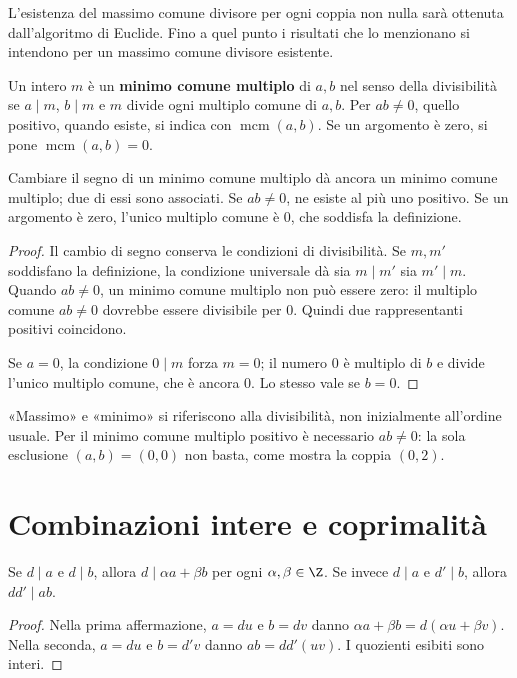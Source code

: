 L'esistenza del massimo comune divisore per ogni coppia non nulla sarà ottenuta dall'algoritmo di Euclide. Fino a quel punto i risultati che lo menzionano si intendono per un massimo comune divisore esistente.

\begin{definizione}
Un intero $m$ è un \textbf{minimo comune multiplo} di $a,b$ nel senso della divisibilità se $a\mid m$, $b\mid m$ e $m$ divide ogni multiplo comune di $a,b$. Per $ab\ne0$, quello positivo, quando esiste, si indica con $\operatorname{mcm}(a,b)$. Se un argomento è zero, si pone $\operatorname{mcm}(a,b)=0$.
\end{definizione}

\begin{proposizione}
Cambiare il segno di un minimo comune multiplo dà ancora un minimo comune multiplo; due di essi sono associati. Se $ab\ne0$, ne esiste al più uno positivo. Se un argomento è zero, l'unico multiplo comune è $0$, che soddisfa la definizione.
\end{proposizione}
\begin{proof}
Il cambio di segno conserva le condizioni di divisibilità. Se $m,m'$ soddisfano la definizione, la condizione universale dà sia $m\mid m'$ sia $m'\mid m$. Quando $ab\ne0$, un minimo comune multiplo non può essere zero: il multiplo comune $ab\ne0$ dovrebbe essere divisibile per $0$. Quindi due rappresentanti positivi coincidono.

Se $a=0$, la condizione $0\mid m$ forza $m=0$; il numero $0$ è multiplo di $b$ e divide l'unico multiplo comune, che è ancora $0$. Lo stesso vale se $b=0$.
\end{proof}

\begin{osservazione}
«Massimo» e «minimo» si riferiscono alla divisibilità, non inizialmente all'ordine usuale. Per il minimo comune multiplo positivo è necessario $ab\ne0$: la sola esclusione $(a,b)=(0,0)$ non basta, come mostra la coppia $(0,2)$.
\end{osservazione}

\section{Combinazioni intere e coprimalità}
\begin{proposizione}\label{prop:combinazioni}
Se $d\mid a$ e $d\mid b$, allora $d\mid\alpha a+\beta b$ per ogni $\alpha,\beta\in\Z$. Se invece $d\mid a$ e $d'\mid b$, allora $dd'\mid ab$.
\end{proposizione}
\begin{proof}
Nella prima affermazione, $a=du$ e $b=dv$ danno $\alpha a+\beta b=d(\alpha u+\beta v)$. Nella seconda, $a=du$ e $b=d'v$ danno $ab=dd'(uv)$. I quozienti esibiti sono interi.
\end{proof}

